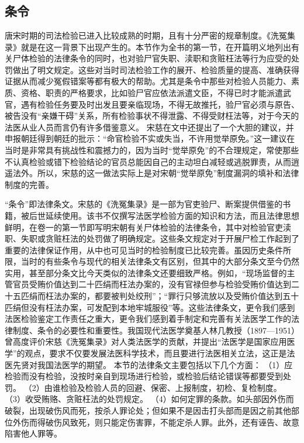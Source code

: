 \documentclass[12pt,UTF8]{ctexbook}
\begin{document}
\mainmatter

\part{}

\chapter{条令}

唐宋时期的司法检验已进入比较成熟的时期，且有十分严密的规章制度。《洗冤集录》就是在这一背景下出现产生的。本节作为全书的第一节，在开篇明义地列出有关尸体检验的法律条令的同时，也对验尸官失职、渎职和贪赃枉法等行为应受的处罚做出了明文规定。这些对当时司法检验工作的展开、检验质量的提高、准确获得证据从而减少冤假错案等都有极大的帮助。尤其是条令中那些对检验人员能力、素质、资格、职责的严格要求，比如验尸官应依法派遣文臣，不得已时才能派遣武官，遇有检验任务要及时出发且要亲临现场，不得无故推托，验尸官必须与原告、被告没有“亲嫌干碍”关系，所有检验事状不得泄露、不得受财枉法等，对于今天的法医从业人员而言仍有许多借鉴意义。
宋慈在文中还提出了一个大胆的建议，并申报朝廷得到朝廷的批示：“命官检验不实或失当，不许用觉举原免。”这一建议在当时是非常具有挑战性和震撼力的，因为当时“觉举原免”的不合理规定，常使那些不认真检验或错下检验结论的官员总能因自己的主动坦白减轻或逃脱罪责，从而逍遥法外。所以，宋慈的这一做法实际上是对宋朝“觉举原免”制度漏洞的填补和法律制度的完善。

“条令”即法律条文。宋慈的《洗冤集录》是一部为官吏验尸、断案提供借鉴的书籍，被后世延续使用。该书不仅撰写法医学检验方面的知识和方法，而且法律思想鲜明，在卷一的第一节即写明宋朝有关尸体检验的法律条令，其中对检验官吏渎职、失职或贪赃枉法的处罚做了明确规定。这些条文规定对于开展尸检工作起到了重要的法律保证作用，从中也可见当时的检验制度已比较完善。虽因历史条件所限，当时的有些条令与现代的相关法律条文有区别，但其中的大部分条文至今仍然实用，甚至部分条文比今天类似的法律条文还要细致严格。例如，“现场监督的主管官员受贿价值达到二十匹绢而枉法办案的，没有官禄但参与检验受贿价值达到二十五匹绢而枉法办案的，都要被判处绞刑”；“罪行只够流放以及受贿价值达到五十匹绢但没有枉法办案，可发配到本地牢城服役”等。这些法律条文，更令我们感到法医检验鉴定工作责任之重大，更令我们感到着手制定和完善有关法医学工作的法律制度、条令的必要性和重要性。我国现代法医学奠基人林几教授（1897—1951）曾高度评价宋慈《洗冤集录》对人类法医学的贡献，并提出“法医学是国家应用医学”的观点，要求不仅要发展法医科学技术，而且要进行法医相关立法，这正是法医先贤对我国法医学的期望。
本节的法律条文主要包括以下几个方面：
（1）应检验而没有检验，没按时亲自到现场进行检验，或检验后结论错误等都要受到处罚。
（2）由谁检验及检验人员的回避、保密、上报制度，初检、复检制度。
（3）收受贿赂、贪赃枉法的处罚规定。
（4）如何定罪的条款。如头部因外伤而破裂，出现破伤风而死，按杀人罪论处；但如果不是因击打头部而是因之前其他部位外伤而得破伤风致死，则只能定伤害罪，不能定杀人罪。此外，还有诬告、故意陷害他人罪等。
\end{document}
